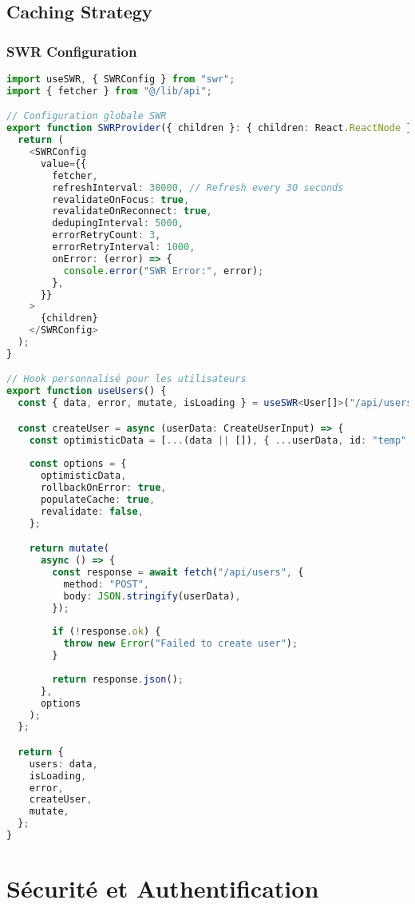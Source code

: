 \subsection{Caching Strategy}

\subsubsection{SWR Configuration}

\begin{lstlisting}[language=TypeScript, caption=Configuration SWR pour le cache]
import useSWR, { SWRConfig } from "swr";
import { fetcher } from "@/lib/api";

// Configuration globale SWR
export function SWRProvider({ children }: { children: React.ReactNode }) {
  return (
    <SWRConfig
      value={{
        fetcher,
        refreshInterval: 30000, // Refresh every 30 seconds
        revalidateOnFocus: true,
        revalidateOnReconnect: true,
        dedupingInterval: 5000,
        errorRetryCount: 3,
        errorRetryInterval: 1000,
        onError: (error) => {
          console.error("SWR Error:", error);
        },
      }}
    >
      {children}
    </SWRConfig>
  );
}

// Hook personnalisé pour les utilisateurs
export function useUsers() {
  const { data, error, mutate, isLoading } = useSWR<User[]>("/api/users");

  const createUser = async (userData: CreateUserInput) => {
    const optimisticData = [...(data || []), { ...userData, id: "temp" }];
    
    const options = {
      optimisticData,
      rollbackOnError: true,
      populateCache: true,
      revalidate: false,
    };

    return mutate(
      async () => {
        const response = await fetch("/api/users", {
          method: "POST",
          body: JSON.stringify(userData),
        });
        
        if (!response.ok) {
          throw new Error("Failed to create user");
        }
        
        return response.json();
      },
      options
    );
  };

  return {
    users: data,
    isLoading,
    error,
    createUser,
    mutate,
  };
}
\end{lstlisting}

\section{Sécurité et Authentification}

